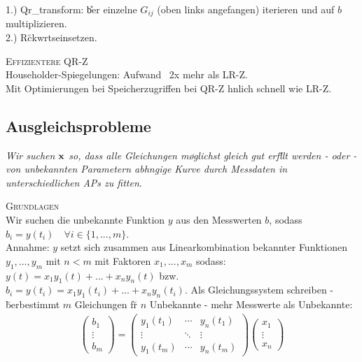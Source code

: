1.) Qr\_transform: \U ber einzelne $G_{ij}$ (oben links angefangen) iterieren und auf $b$ multiplizieren. \\
2.) R\u ckw\a rtseinsetzen.\vspace{0.2cm}

\textsc{Effizientere QR-Z}\\
Householder-Spiegelungen: Aufwand ~2x mehr als LR-Z.\\
Mit Optimierungen bei Speicherzugriffen bei QR-Z \a hnlich schnell wie LR-Z.\vspace{0.2cm}

\subsection{Ausgleichsprobleme}
\emph{Wir suchen $\mbox{\bf x}$ so, dass alle Gleichungen m\o glichst gleich gut erf\u llt werden - oder - von unbekannten Parametern abh\a ngige Kurve durch Messdaten in unterschiedlichen APs zu \emph{fitten}}.

\textsc{Grundlagen}\\
Wir suchen die unbekannte Funktion $y$ aus den Messwerten $b$, sodass $b_i =y(t_i) \quad \forall i\in \{1,...,m\}$. \\ Annahme: $y$ setzt sich zusammen aus Linearkombination bekannter Funktionen $y_1, ..., y_m$ mit $n<m$ mit Faktoren $x_1, ...,x_m$ sodass: $y(t) = x_1y_1(t) + ... + x_ny_n(t)$ bzw. $b_i = y(t_i) = x_1y_1(t_i) + ... + x_ny_n(t_i)$. Als Gleichungssystem schreiben - \u berbestimmt $m$ Gleichungen f\u r $n$ Unbekannte - mehr Messwerte als Unbekannte:
\begin{align*}
\begin{pmatrix}
b_1 \\
\vdots\\
b_m
\end{pmatrix}
=
\begin{pmatrix}
y_1(t_1) & \cdots & y_n(t_1)\\
\vdots & \ddots & \vdots \\
y_1(t_m) & \cdots & y_n(t_m)
\end{pmatrix}
\begin{pmatrix}
x_1 \\
\vdots\\
x_n
\end{pmatrix}
\end{align*}

